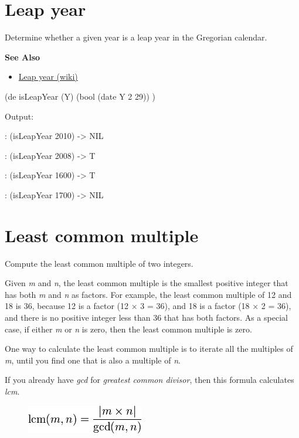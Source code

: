 \pagebreak{}
\section*{Leap year}

Determine whether a given year is a leap year in the Gregorian calendar.

\textbf{See Also}

\begin{itemize}
\item
  \href{http://en.wikipedia.org/wiki/Leap\_year}{Leap year (wiki)}
\end{itemize}

\begin{wideverbatim}

(de isLeapYear (Y)
   (bool (date Y 2 29)) )

Output:

: (isLeapYear 2010)
-> NIL

: (isLeapYear 2008)
-> T

: (isLeapYear 1600)
-> T

: (isLeapYear 1700)
-> NIL

\end{wideverbatim}

\pagebreak{}
\section*{Least common multiple}

Compute the least common multiple of two integers.

Given \emph{m} and \emph{n}, the least common multiple is the smallest
positive integer that has both \emph{m} and \emph{n} as factors. For
example, the least common multiple of 12 and 18 is 36, because 12 is a
factor (12 × 3 = 36), and 18 is a factor (18 × 2 = 36), and there is no
positive integer less than 36 that has both factors. As a special case,
if either \emph{m} or \emph{n} is zero, then the least common multiple
is zero.

One way to calculate the least common multiple is to iterate all the
multiples of \emph{m}, until you find one that is also a multiple of
\emph{n}.

If you already have \emph{gcd} for
\emph{greatest common divisor}, then
this formula calculates \emph{lcm}.

\begin{figure}[H]
\centering
\includegraphics[scale=.6]{graphics/fe9a069fecbc644b6137c76e3dbe21b8.png}
\end{figure}

